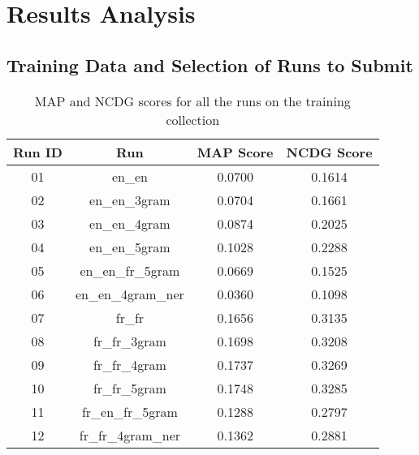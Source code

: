 \newpage
\section{Results Analysis}
\label{sec:results}

\subsection{Training Data and Selection of Runs to Submit}\label{subsec:runs_selection}

\begin{table}[h!]
    \begin{center}
        \caption{MAP and NCDG scores for all the runs on the training collection}
        \label{tab:all_scores}
        \begin{tabular}{|c|c||c|c|}
            \hline
            \textbf{Run ID} & \textbf{Run} & \textbf{MAP Score} & \textbf{NCDG Score}\\
            \hline\hline
            01 & en\_en & \cellcolor{red!30!white}0.0700 & \cellcolor{red!30!white}0.1614 \\
            \hline
            02 & en\_en\_3gram & 0.0704 & 0.1661 \\
            \hline
            03 & en\_en\_4gram & 0.0874 & 0.2025 \\
            \hline
            04 & en\_en\_5gram & 0.1028 & 0.2288 \\
            \hline
            05 & en\_en\_fr\_5gram & \cellcolor{red!60!white}0.0669 & \cellcolor{red!60!white}0.1525 \\
            \hline
            06 & en\_en\_4gram\_ner & \cellcolor{red}0.0360 & \cellcolor{red}0.1098 \\
            \hline
            07 & fr\_fr & 0.1656 & 0.3135 \\
            \hline
            08 & fr\_fr\_3gram & \cellcolor{green!30!white}0.1698 & \cellcolor{green!30!white}0.3208 \\
            \hline
            09 & fr\_fr\_4gram & \cellcolor{green!60!white}0.1737 & \cellcolor{green!60!white}0.3269 \\
            \hline
            10 & fr\_fr\_5gram & \cellcolor{green}0.1748 & \cellcolor{green}0.3285 \\
            \hline
            11 & fr\_en\_fr\_5gram & 0.1288 & 0.2797 \\
            \hline
            12 & fr\_fr\_4gram\_ner & 0.1362 & 0.2881 \\
            \hline
        \end{tabular}
    \end{center}
\end{table}

